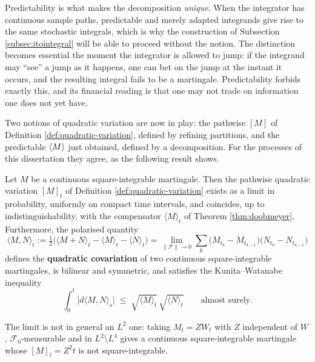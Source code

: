 Predictability is what makes the decomposition \emph{unique}. When the integrator has
continuous sample paths, predictable and merely adapted integrands give rise to the same
stochastic integrals, which is why the construction of Subsection \ref{subsec:itointegral} will be
able to proceed without the notion. The distinction becomes essential the moment the integrator is
allowed to jump: if the integrand may
``see'' a jump as it happens, one can bet on the jump at the instant it occurs, and the resulting
integral fails to be a martingale. Predictability forbids exactly this, and its financial reading is
that one may not trade on information one does not yet have. 

Two notions of quadratic variation are now in play: the pathwise $[M]$ of Definition
\ref{def:quadratic-variation}, defined by refining partitions, and the predictable $\langle M \rangle$ just
obtained, defined by a decomposition. For the processes of this dissertation they agree, as the following result shows.  

\begin{proposition}\label{prop:qvcoincide}
Let $M$ be a continuous square-integrable martingale. Then the pathwise quadratic variation 
$[M]_t$ of Definition \ref{def:quadratic-variation} exists as a limit in probability, uniformly on
compact time intervals, and 
coincides, up to indistinguishability, with the compensator $\langle M \rangle_t$ of Theorem 
\ref{thm:doobmeyer}.  Furthermore, the polarised quantity
\begin{equation}\label{eq:polarisation}
\langle M, N \rangle_t := \tfrac{1}{2}\bigl( \langle M+N \rangle_t - \langle M \rangle_t - \langle N \rangle_t \bigr)
= \lim_{\lVert\mathcal{P}\rVert\to0} \sum_k \bigl(M_{t_k}-M_{t_{k-1}}\bigr)\bigl(N_{t_k}-N_{t_{k-1}}\bigr)
\end{equation}
defines the \textbf{quadratic covariation} of two continuous square-integrable martingales, is 
bilinear and symmetric, and satisfies the Kunita--Watanabe inequality
\begin{equation}
\int_0^t \bigl| d\langle M,N\rangle_s \bigr| \;\leq\; \sqrt{\langle M\rangle_t}\,\sqrt{\langle N\rangle_t}
\qquad \text{almost surely.}
\end{equation}
\qedopen
\end{proposition}

The limit is not in general an $L^{2}$ one: taking $M_t = ZW_t$ with $Z$
independent of $W$, $\mathcal{F}_0$-measurable and in $L^{2}\setminus L^{4}$ gives a continuous
square-integrable martingale whose $[M]_t = Z^{2}t$ is not square-integrable.

